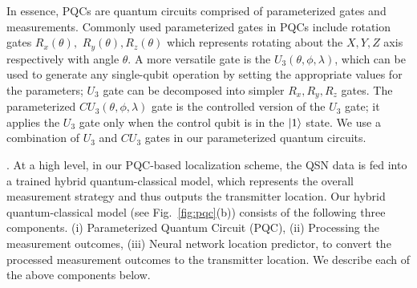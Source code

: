 In essence, PQCs are quantum circuits comprised of parameterized gates and measurements.
Commonly used parameterized gates in PQCs include rotation gates $R_x(\theta),$ $R_y(\theta),R_z(\theta)$ which represents rotating about the $X,Y,Z$ axis respectively with angle $\theta$.
A more versatile gate is the $U_3(\theta, \phi, \lambda)$, which can be used to generate any single-qubit operation by setting the appropriate values for the parameters;
$U_3$ gate can be decomposed into simpler $R_x, R_y, R_z$ gates.
The parameterized $CU_3(\theta, \phi, \lambda)$ gate is the controlled 
version of the $U_3$ gate; it applies the $U_3$ gate only when the control qubit 
is in the $\ket{1}$ state.
We use a combination of $U_3$ and $CU_3$ gates in our parameterized quantum circuits. 

.
At a high level, in our PQC-based localization scheme, the QSN data is fed into a trained hybrid quantum-classical model, which represents the overall measurement strategy and thus outputs the transmitter location. 
Our hybrid quantum-classical model (see Fig.~\ref{fig:pqc}(b)) consists
of the following three components.
(i) Parameterized Quantum Circuit (PQC), (ii) Processing the measurement outcomes,
(iii) Neural network location predictor, to convert the processed measurement outcomes to the transmitter location.
We describe each of the above components below.

